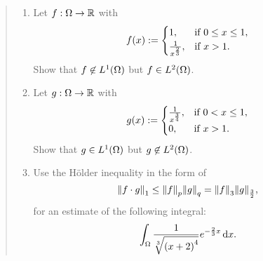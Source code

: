 \documentclass[english]{exercise}
\begin{document}
	\section{}
	\begin{quote}
		\begin{enumerate}
			\item Let \(f: \Omega \to \R\) with
			\[
				f\parentheses*{x} := \begin{cases}
					1, & \text{if }0 \le x \le 1,\\
					\frac{1}{x^{\frac{2}{3}}}, & \text{if }x > 1.
				\end{cases}
			\]
			Show that \(f \not\in L^1\parentheses*{\Omega}\) but \(f \in L^2\parentheses*{\Omega}\).
			\item Let \(g: \Omega \to \R\) with
			\[
				g\parentheses*{x} := \begin{cases}
					\frac{1}{x^{\frac{3}{4}}}, & \text{if }0 < x \le 1,\\
					0, & \text{if }x > 1.
				\end{cases}
			\]
			Show that \(g \in L^1\parentheses*{\Omega}\) but \(g \not\in L^2\parentheses*{\Omega}\).
			\item Use the Hölder inequality in the form of
			\[
				\norm*{f \cdot g}_1 \le \norm*{f}_p \norm*{g}_q = \norm*{f}_3 \norm*{g}_{\frac{3}{2}},
			\]
			for an estimate of the following integral:
			\[
				\int_\Omega \frac{1}{\sqrt[3]{\parentheses*{x + 2}^4}}e^{-\frac{2}{3}x}\d x.
			\]
		\end{enumerate}
	\end{quote}
\end{document}
